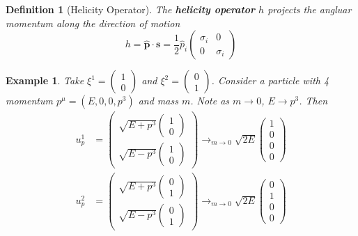 \documentclass{article}
\newtheorem{definition}{Definition}[subsection]
\newtheorem{example}{Example}[subsection]
\newcommand{\bam}[1]{\textbf{#1}}
\begin{document}
\begin{definition}[Helicity Operator]
The \bam{helicity operator} $h$ projects the angluar momentum along the direction of motion 
\[
h=\hat{\bm{p}} \cdot \bm{s} = \frac{1}{2}\hat{p}_i \begin{pmatrix} \sigma_i & 0 \\ 0 & \sigma_i \end{pmatrix}
\]
\end{definition}

\begin{example}
Take $\xi^1=\begin{pmatrix} 1 \\ 0 \end{pmatrix}$ and $\xi^2=\begin{pmatrix} 0 \\ 1 \end{pmatrix}$. Consider a particle with 4 momentum $p^\mu = (E,0,0,p^3)$ and mass $m$. Note as $m \to 0$, $E \to p^3$. Then 
\begin{align*}
    u_p^1 &= \begin{pmatrix} \sqrt{E+p^3} \begin{pmatrix} 1 \\ 0 \end{pmatrix} \\ \sqrt{E-p^3} \begin{pmatrix} 1 \\ 0 \end{pmatrix} \end{pmatrix} \to_{m \to 0} \sqrt{2E}\begin{pmatrix} 1 \\ 0 \\ 0 \\ 0 \end{pmatrix} \\
    u_p^2 &= \begin{pmatrix} \sqrt{E+p^3} \begin{pmatrix} 0 \\ 1 \end{pmatrix} \\ \sqrt{E-p^3} \begin{pmatrix} 0 \\ 1 \end{pmatrix} \end{pmatrix} \to_{m \to 0} \sqrt{2E}\begin{pmatrix} 0 \\ 1 \\ 0 \\ 0 \end{pmatrix} \\
\end{align*}


\end{example}
\end{document}
